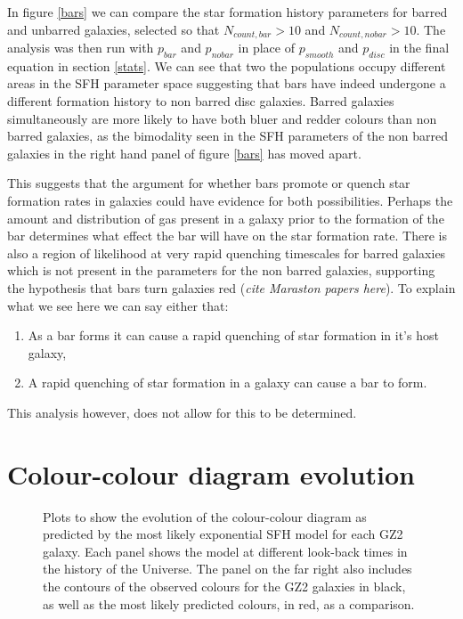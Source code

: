 \documentclass{mn2e}
\begin{document}
In figure \ref{bars} we can compare the star formation history parameters for barred and unbarred galaxies, selected so that $N_{count, bar} > 10$ and $N_{count, no bar} > 10$. The analysis was then run with $p_{bar}$ and $p_{no bar}$ in place of $p_{smooth}$ and $p_{disc}$ in the final equation in section \ref{stats}. We can see that two the populations occupy different areas in the SFH parameter space suggesting that bars have indeed undergone a different formation history to non barred disc galaxies.  Barred galaxies simultaneously are more likely to have both bluer and redder colours than non barred galaxies, as the bimodality seen in the SFH parameters of the non barred galaxies in the right hand panel of figure \ref{bars} has moved apart. 

This suggests that the argument for whether bars promote or quench star formation rates in galaxies could have evidence for both possibilities. Perhaps the amount and distribution of gas present in a galaxy prior to the formation of the bar determines what effect the bar will have on the star formation rate. There is also a region of likelihood at very rapid quenching timescales for barred galaxies which is not present in the parameters for the non barred galaxies, supporting the hypothesis that bars turn galaxies red (\emph{cite Maraston papers here}). To explain what we see here we can say either that:
\begin{enumerate}
\item As a bar forms it can cause a rapid quenching of star formation in it's host galaxy,
\item A rapid quenching of star formation in a galaxy can cause a bar to form.
\end{enumerate}
This analysis however, does not allow for this to be determined. 

\section{Colour-colour diagram evolution}
\begin{figure}
\caption{Plots to show the evolution of the colour-colour diagram as predicted by the most likely exponential SFH model for each GZ2 galaxy. Each panel shows the model at different look-back times in the history of the Universe. The panel on the far right also includes the contours of the observed colours for the GZ2 galaxies in black, as well as the most likely predicted colours, in red, as a comparison.}
\label{c_c_evo}
\end{figure}
\end{document}
